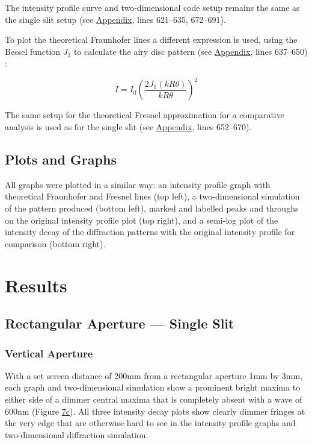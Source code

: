 \documentclass[12pt]{article}
\begin{document}
The intensity profile curve and two-dimensional code setup remains the same as the single slit setup (see \hyperref[sec:A]{Appendix}, lines 621–635, 672–691).

To plot the theoretical Fraunhofer lines a different expression is used, using the Bessel function \( J_1 \) to calculate the airy disc pattern (see \hyperref[sec:A]{Appendix}, lines 637–650) \cite{lecture1999}:

\begin{equation} \label{eq:9}
    I = I_0 \left( \frac{2 J_1 (k R \theta)}{k R \theta} \right) ^2
\end{equation}

The same setup for the theoretical Fresnel approximation for a comparative analysis is used as for the single slit (see \hyperref[sec:A]{Appendix}, lines 652–670).

\subsection{Plots and Graphs}

All graphs were plotted in a similar way: an intensity profile graph with theoretical Fraunhofer and Fresnel lines (top left), a two-dimensional simulation of the pattern produced (bottom left), marked and labelled peaks
and throughs on the original intensity profile plot (top right), and a semi-log plot of the intensity decay of the diffraction patterns with the original intensity profile for comparison (bottom right).

\section{Results} \label{sec:4}

\subsection{Rectangular Aperture — Single Slit}

\subsubsection{Vertical Aperture}

With a set screen distance of 200mm from a rectangular aperture 1mm by 3mm, each graph and two-dimensional simulation show a prominent bright maxima to either side of a dimmer central maxima that is
completely absent with a wave of 600nm (Figure \hyperref[fig:7c]{7c}). All three intensity decay plots show clearly dimmer fringes at the very edge that are otherwise hard to see in the intensity
profile graphs and two-dimensional diffraction simulation.
\end{document}
